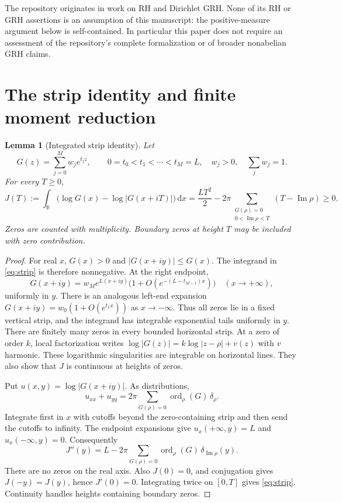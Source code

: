 \documentclass[11pt]{article}
\newtheorem{lemma}[theorem]{Lemma}
\theoremstyle{remark}\newtheorem{remark}[theorem]{Remark}
\newcommand{\R}{\mathbb R}
\newcommand{\dd}{\,\mathrm d}
\newcommand{\Impart}{\operatorname{Im}}
\begin{document}
The repository originates in work on RH and Dirichlet GRH. None of its RH or GRH
assertions is an assumption of this manuscript: the positive-measure argument
below is self-contained. In particular this paper does not require an assessment
of the repository's complete formalization or of broader nonabelian GRH claims.

\section{The strip identity and finite moment reduction}

\begin{lemma}[Integrated strip identity]\label{lem:strip}
Let
\[
 G(z)=\sum_{j=0}^M w_j e^{t_jz},\qquad
 0=t_0<t_1<\cdots<t_M=L,\quad w_j>0,\quad\sum_jw_j=1.
\]
For every $T\ge0$,
\begin{equation}\label{eq:strip}
 J(T):=\int_\R\bigl(\log G(x)-\log|G(x+iT)|\bigr)\dd x
 =\frac{LT^2}{2}-2\pi\sum_{\substack{G(\rho)=0\\0<\Impart\rho<T}}
       (T-\Impart\rho)\ge0.
\end{equation}
Zeros are counted with multiplicity. Boundary zeros at height $T$ may be included
with zero contribution.
\end{lemma}

\begin{proof}
For real $x$, $G(x)>0$ and $|G(x+iy)|\le G(x)$. The integrand in
\eqref{eq:strip} is therefore nonnegative. At the right endpoint,
\[
 G(x+iy)=w_Me^{L(x+iy)}\bigl(1+O(e^{-(L-t_{M-1})x})\bigr)
 \quad(x\longrightarrow+\infty),
\]
uniformly in $y$. There is an analogous left-end expansion
$G(x+iy)=w_0(1+O(e^{t_1x}))$ as $x\to-\infty$.
Thus all zeros lie in a fixed vertical strip, and the integrand has integrable
exponential tails uniformly in $y$. There are finitely many zeros in every
bounded horizontal strip. At a zero of order $k$, local factorization writes
$\log|G(z)|=k\log|z-\rho|+v(z)$ with $v$ harmonic. These logarithmic
singularities are integrable on horizontal lines. They also show that $J$ is
continuous at heights of zeros.

Put $u(x,y)=\log|G(x+iy)|$. As distributions,
\[
 u_{xx}+u_{yy}=2\pi\sum_{G(\rho)=0}\operatorname{ord}_\rho(G)\,\delta_\rho.
\]
Integrate first in $x$ with cutoffs beyond the zero-containing strip and then
send the cutoffs to infinity. The endpoint expansions give
$u_x(+\infty,y)=L$ and $u_x(-\infty,y)=0$. Consequently
\[
 J''(y)=L-2\pi\sum_{G(\rho)=0}
            \operatorname{ord}_\rho(G)\,\delta_{\Impart\rho}(y).
\]
There are no zeros on the real axis. Also $J(0)=0$, and conjugation gives
$J(-y)=J(y)$, hence $J'(0)=0$. Integrating twice on $[0,T]$ gives
\eqref{eq:strip}. Continuity handles heights containing boundary zeros.
\end{proof}
\end{document}

